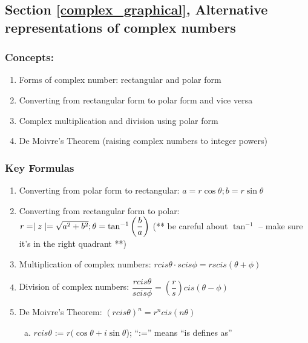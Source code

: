 \subsection*{Section \ref{complex_graphical}, Alternative representations of complex numbers}
\subsubsection*{Concepts:}
\begin{enumerate}
\item 
Forms of complex number: rectangular and polar form
\item
Converting from rectangular form to polar form and vice versa
\item
Complex multiplication and division using polar form
\item
De Moivre's Theorem (raising complex numbers to integer powers)
\end{enumerate}

\subsubsection*{Key Formulas}
\begin{enumerate}
\item 
Converting from polar form to rectangular: $a = r\cos\theta; b = r\sin\theta$
\item 
Converting from rectangular form to polar: $r = \mid z \mid = \sqrt{a^{2}+b^{2}}; \\\theta = \tan^{-1}\left(\dfrac{b}{a}\right)$ (** be careful about $\tan^{-1}$ -- make sure it's in the right quadrant **)    
\item 
Multiplication of complex numbers: $rcis \theta \cdot scis \phi = rscis(\theta + \phi)$ 
\item 
Division of complex numbers: $\dfrac{rcis \theta}{scis \phi} = \left(\dfrac{r}{s}\right)cis(\theta - \phi)$
\item 
De Moivre's Theorem: $(rcis \theta)^{n} = r^{n}cis(n \theta)$

\begin{enumerate}[(a)]
\item
$rcis \theta \text{ := } r(\cos\theta +  i\sin\theta$); ``:='' means ``is defines as''
\end{enumerate}
\end{enumerate}

